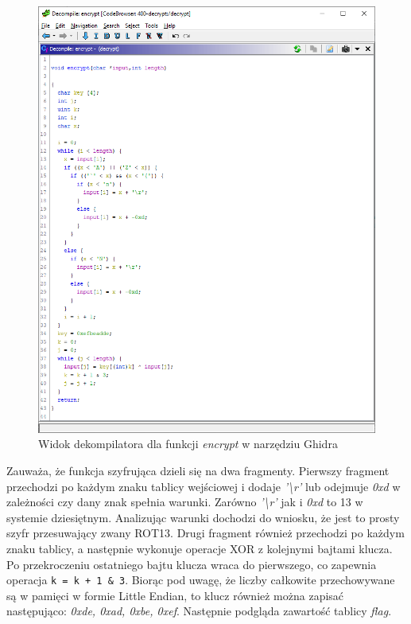 \documentclass[language=polish,type=eng]{aghmodern}
\begin{document}
\begin{appendices}
\begin{figure}[H]
\centering
\includegraphics[width=\textwidth]{400_encrypt}
\caption{Widok dekompilatora dla funkcji \emph{encrypt} w narzędziu Ghidra}
\end{figure}

Zauważa, że funkcja szyfrująca dzieli się na dwa fragmenty.
Pierwszy fragment przechodzi po każdym znaku tablicy wejściowej i dodaje
\emph{'\textbackslash r'} lub
odejmuje \emph{0xd} w zależności czy dany znak spełnia warunki.
Zarówno \emph{'\textbackslash r'} jak i \emph{0xd} to 13 w systemie dziesiętnym.
Analizując warunki dochodzi do wniosku, że jest to prosty szyfr przesuwający zwany ROT13.
Drugi fragment również przechodzi po każdym znaku tablicy, a następnie wykonuje
operacje XOR z kolejnymi bajtami klucza. Po przekroczeniu ostatniego bajtu klucza
wraca do pierwszego, co zapewnia operacja \texttt{k = k + 1 & 3}.
Biorąc pod uwagę, że liczby całkowite przechowywane
są w pamięci w formie Little Endian, to klucz również można zapisać następująco:
\emph{0xde, 0xad, 0xbe, 0xef}. Następnie podgląda zawartość tablicy \emph{flag}.


\end{appendices}
\end{document}
